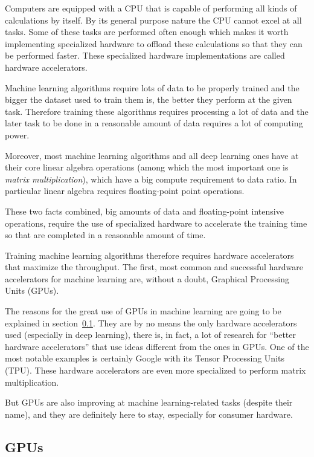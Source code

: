 \documentclass{sapthesis}
\begin{document}
Computers are equipped with a CPU that is capable of performing all kinds of
calculations by itself. By its general purpose nature the CPU cannot excel at
all tasks. Some of these tasks are performed often enough which makes it worth
implementing specialized hardware to offload these calculations so that
they can be performed faster. These specialized hardware implementations are
called hardware accelerators.

Machine learning algorithms require lots of data to be properly trained and the
bigger the dataset used to train them is, the better they perform at the given
task. Therefore training these algorithms requires processing a lot of data and
the later task to be done in a reasonable amount of data requires a lot of
computing power.

Moreover, most machine learning algorithms and all deep learning ones have at
their core linear algebra operations (among which the most important one is
\emph{matrix multiplication}), which have a big compute requirement to data
ratio. In particular linear algebra requires floating-point point operations.

These two facts combined, big amounts of data and floating-point intensive
operations, require the use of specialized hardware to accelerate the training
time so that are completed in a reasonable amount of time.

Training machine learning algorithms therefore requires hardware accelerators
that maximize the throughput. The first, most common and successful hardware
accelerators for machine learning are, without a doubt, Graphical Processing
Units (GPUs).

The reasons for the great use of GPUs in machine learning are going to be
explained in section~\ref{sec:gpus}. They are by no means the only hardware
accelerators used (especially in deep learning), there is, in fact, a lot of
research for ``better hardware accelerators'' that use ideas different from the
ones in GPUs. One of the most notable examples is certainly Google with its
Tensor Processing Units (TPU). These hardware accelerators are even more
specialized to perform matrix multiplication.

But GPUs are also improving at machine learning-related tasks (despite their name),
and they are definitely here to stay, especially for consumer hardware.

\subsection{GPUs}\label{sec:gpus}
\end{document}
